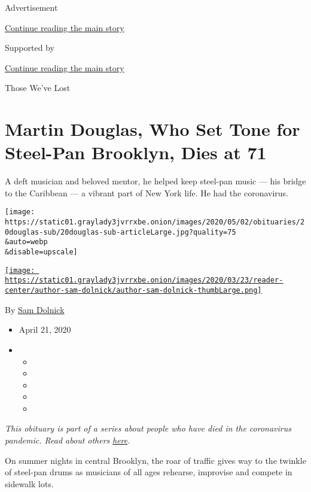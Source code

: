 Advertisement

\protect\hyperlink{after-top}{Continue reading the main story}

Supported by

\protect\hyperlink{after-sponsor}{Continue reading the main story}

Those We've Lost

\hypertarget{martin-douglas-who-set-tone-for-steel-pan-brooklyn-dies-at-71}{%
\section{Martin Douglas, Who Set Tone for Steel-Pan Brooklyn, Dies at
71}\label{martin-douglas-who-set-tone-for-steel-pan-brooklyn-dies-at-71}}

A deft musician and beloved mentor, he helped keep steel-pan music ---
his bridge to the Caribbean --- a vibrant part of New York life. He had
the coronavirus.

\texttt{[image: https://static01.graylady3jvrrxbe.onion/images/2020/05/02/obituaries/20douglas-sub/20douglas-sub-articleLarge.jpg?quality=75\\\&auto=webp\\\&disable=upscale]}

\href{https://www.nytimes3xbfgragh.onion/by/sam-dolnick}{\texttt{[image: https://static01.graylady3jvrrxbe.onion/images/2020/03/23/reader-center/author-sam-dolnick/author-sam-dolnick-thumbLarge.png]}}

By \href{https://www.nytimes3xbfgragh.onion/by/sam-dolnick}{Sam Dolnick}

\begin{itemize}
\item
  April 21, 2020
\item
  \begin{itemize}
  \item
  \item
  \item
  \item
  \item
  \end{itemize}
\end{itemize}

\emph{This obituary is part of a series about people who have died in
the coronavirus pandemic. Read about others}
\href{https://www.nytimes3xbfgragh.onion/series/people-who-have-died-of-the-coronavirus}{\emph{here}}\emph{.}

On summer nights in central Brooklyn, the roar of traffic gives way to
the twinkle of steel-pan drums as musicians of all ages rehearse,
improvise and compete in sidewalk lots.

